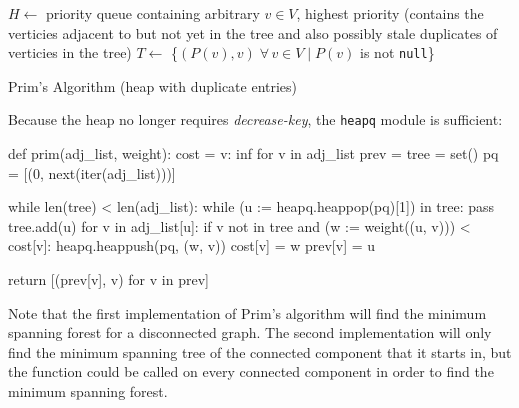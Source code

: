 \documentclass[12pt, titlepage]{article}
\begin{document}
\begin{algorithm}[H]
  \SetAlgoLined
  \DontPrintSemicolon
  $H \longleftarrow$\hspace{0.5mm} priority queue containing arbitrary $v\in V$, highest priority\;
  \hspace{13mm}(contains the verticies adjacent to but not yet in the tree and\;
  \hspace{13mm}also possibly stale duplicates of verticies in the tree)\;
  $T \longleftarrow$\hspace{0.5mm} \{$(P(v), v)\;\forall\,v\in V\mid P(v)$ is not \texttt{null}\}\;
  \;
    \caption{Prim's Algorithm (heap with duplicate entries)}
\end{algorithm} \medskip

Because the heap no longer requires \textit{decrease-key}, the \texttt{heapq} module is sufficient: \medskip

\begin{python}
def prim(adj_list, weight):
    cost = {v: inf for v in adj_list}
    prev = {}
    tree = set()
    pq = [(0, next(iter(adj_list)))]

    while len(tree) < len(adj_list):
        while (u := heapq.heappop(pq)[1]) in tree: pass
        tree.add(u)
        for v in adj_list[u]:
            if v not in tree and (w := weight((u, v))) < cost[v]:
                heapq.heappush(pq, (w, v))
                cost[v] = w
                prev[v] = u
        
    return [(prev[v], v) for v in prev]
\end{python}

Note that the first implementation of Prim's algorithm will find the minimum spanning forest for a disconnected graph. The second implementation will only find the minimum spanning tree of the connected component that it starts in, but the function could be called on every connected component in order to find the minimum spanning forest.
\end{document}
